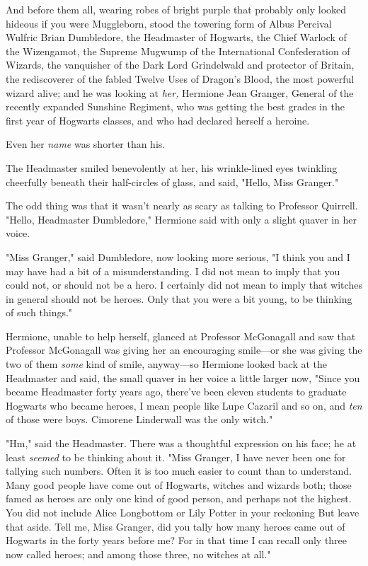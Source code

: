 And before them all, wearing robes of bright purple that probably only looked
hideous if you were Muggleborn, stood the towering form of Albus Percival
Wulfric Brian Dumbledore, the Headmaster of Hogwarts, the Chief Warlock of the
Wizengamot, the Supreme Mugwump of the International Confederation of Wizards,
the vanquisher of the Dark Lord Grindelwald and protector of Britain, the
rediscoverer of the fabled Twelve Uses of Dragon's Blood, the most powerful
wizard alive; and he was looking at \emph{her,} Hermione Jean Granger, General
of the recently expanded Sunshine Regiment, who was getting the best grades in
the first year of Hogwarts classes, and who had declared herself a heroine.

Even her \emph{name} was shorter than his.

The Headmaster smiled benevolently at her, his wrinkle-lined eyes twinkling
cheerfully beneath their half-circles of glass, and said, "Hello, Miss Granger."

The odd thing was that it wasn't nearly as scary as talking to Professor
Quirrell. "Hello, Headmaster Dumbledore," Hermione said with only a slight
quaver in her voice.

"Miss Granger," said Dumbledore, now looking more serious, "I think you and I
may have had a bit of a misunderstanding. I did not mean to imply that you
could not, or should not be a hero. I certainly did not mean to imply that
witches in general should not be heroes. Only that you were{\el} a bit
young, to be thinking of such things."

Hermione, unable to help herself, glanced at Professor McGonagall and saw that
Professor McGonagall was giving her an encouraging smile---or she was giving
the two of them \emph{some} kind of smile, anyway---so Hermione looked back at
the Headmaster and said, the small quaver in her voice a little larger now,
"Since you became Headmaster forty years ago, there've been eleven students to
graduate Hogwarts who became heroes, I mean people like Lupe Cazaril and so on,
and \emph{ten} of those were boys. Cimorene Linderwall was the only witch."

"Hm," said the Headmaster. There was a thoughtful expression on his face; he at
least \emph{seemed} to be thinking about it. "Miss Granger, I have never been
one for tallying such numbers. Often it is too much easier to count than to
understand. Many good people have come out of Hogwarts, witches and wizards
both; those famed as heroes are only one kind of good person, and perhaps not
the highest. You did not include Alice Longbottom or Lily Potter in your
reckoning{\el} But leave that aside. Tell me, Miss Granger, did you tally
how many heroes came out of Hogwarts in the forty years before me? For in that
time I can recall only three now called heroes; and among those three, no
witches at all."

